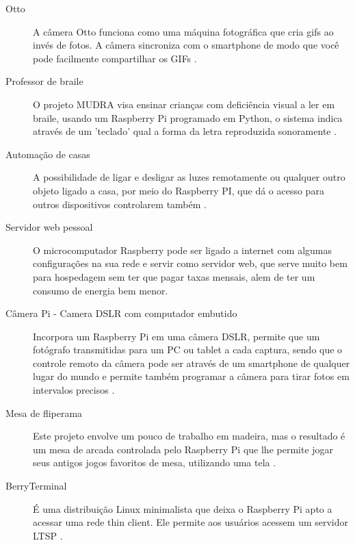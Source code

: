 \documentclass[
	12pt,				%
	openright,			%
	twoside,			%
	a4paper,			%
	chapter=TITLE,		%
	english,			%
	brazil				%
	]{abntex2}
\begin{document}
\begin{description}

\item[Otto] A câmera Otto funciona como uma máquina fotográfica que cria gifs ao invés de fotos. A câmera sincroniza com o smartphone de modo que você pode facilmente compartilhar os GIFs \cite{otto}.
  
\item[Professor de braile] O projeto MUDRA visa ensinar crianças com deficiência visual a ler em braile, usando um Raspberry Pi programado em Python, o sistema indica através de um 'teclado' qual a forma da letra reproduzida sonoramente \cite{mudra}.

\item[Automação de casas] A possibilidade de ligar e desligar as luzes remotamente ou qualquer outro objeto ligado a casa, por meio do Raspberry PI, que dá o acesso para outros dispositivos controlarem também \cite{AplicacaoRaspberry}.

\item[Servidor web pessoal] O microcomputador Raspberry pode ser ligado a internet com algumas configurações na sua rede e servir como servidor web, que serve muito bem para hospedagem sem ter que pagar taxas mensais, alem de ter um consumo de energia bem menor.

\item[Câmera Pi - Camera  DSLR com computador embutido] Incorpora um Raspberry Pi em uma câmera DSLR, permite que um fotógrafo transmitidas para um PC ou tablet a cada captura, sendo que o controle remoto da câmera pode ser através de um smartphone de qualquer lugar do mundo e permite também programar a câmera para tirar fotos em intervalos precisos \cite{cameraPI}.

\item[Mesa de fliperama] Este projeto envolve um pouco de trabalho em madeira, mas o resultado é um mesa de arcada controlada pelo  Raspberry Pi que lhe permite jogar seus antigos jogos favoritos de mesa, utilizando uma tela \cite{AplicacaoRaspberry}.

\item[BerryTerminal] É uma distribuição Linux minimalista que deixa o Raspberry Pi apto a acessar uma rede thin client. Ele permite aos usuários acessem um servidor LTSP \cite{berryterminal}.

\end{description}


\end{document}
